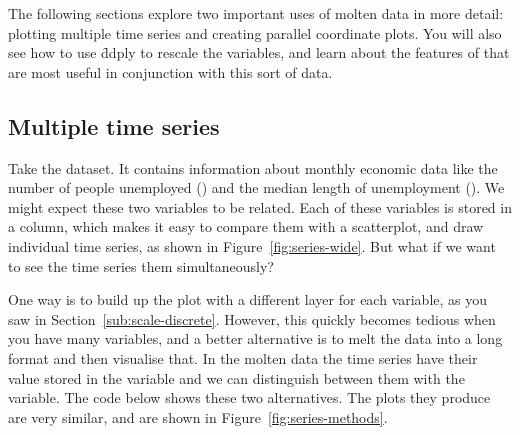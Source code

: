 The following sections explore two important uses of molten data in more detail: plotting multiple time series and creating parallel coordinate plots. You will also see how to use \f{ddply} to rescale the variables, and learn about the features of \ggplot that are most useful in conjunction with this sort of data.

\subsection{Multiple time series}
\label{sub:time-series}

Take the  dataset.  It contains information about monthly economic data like the number of people unemployed () and the median length of unemployment ().  We might expect these two variables to be related.  Each of these variables is stored in a column, which makes it easy to compare them with a scatterplot, and draw individual time series, as shown in Figure~\ref{fig:series-wide}.  But what if we want to see the time series them simultaneously?

% 


One way is to build up the plot with a different layer for each variable, as you saw in Section~\ref{sub:scale-discrete}. However, this quickly becomes tedious when you have many variables, and a better alternative is to melt the data into a long format and then visualise that. In the molten data the time series have their value stored in the  variable and we can distinguish between them with the  variable. The code below shows these two alternatives. The plots they produce are very similar, and are shown in Figure~\ref{fig:series-methods}.

% 
%



